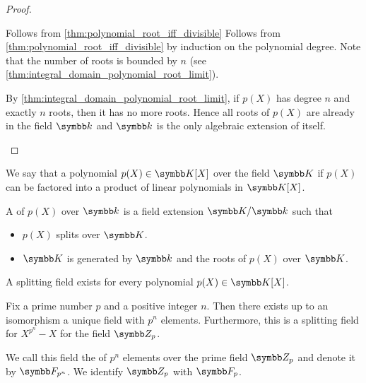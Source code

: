 \begin{proof}
\begin{description}
     Follows from \cref{thm:polynomial_root_iff_divisible} Follows from \cref{thm:polynomial_root_iff_divisible} by induction on the polynomial degree. Note that the number of roots is bounded by \( n \) (see \cref{thm:integral_domain_polynomial_root_limit}).

     By \cref{thm:integral_domain_polynomial_root_limit}, if \( p(X) \) has degree \( n \) and exactly \( n \) roots, then it has no more roots. Hence all roots of \( p(X) \) are already in the field \( \k \) and \( \k \) is the only algebraic extension of itself.
  \end{description}
\end{proof}

\begin{definition}\label{def:splitting_field}\cite[458]{Knapp2016BAlg}
  We say that a polynomial \( p(X) \in \K[X] \) over the field \( \K \)  if \( p(X) \) can be factored into a product of linear polynomials in \( \K[X] \).

  A  of \( p(X) \) over \( \k \) is a field extension \( \K / \k \) such that
  \begin{itemize}
    \item \( p(X) \) splits over \( \K \).
    \item \( \K \) is generated by \( \k \) and the roots of \( p(X) \) over \( \K \).
  \end{itemize}
\end{definition}

\begin{proposition}\label{thm:splitting_field_existence}\cite[theorem 9.12]{Knapp2016BAlg}
  A splitting field exists for every polynomial \( p(X) \in \K[X] \).
\end{proposition}

\begin{theorem}\label{thm:galois_field_existence}\cite[theorem 9.14]{Knapp2016BAlg}
  Fix a prime number \( p \) and a positive integer \( n \). Then there exists up to an isomorphism a unique field with \( p^n \) elements. Furthermore, this is a splitting field for \( X^{p^n} - X \) for the field \( \Z_p \).

  We call this field the  of \( p^n \) elements over the prime field \( \Z_p \) and denote it by
  \( \F_{p^n} \). We identify \( \Z_p \) with \( \F_p \).
\end{theorem}

